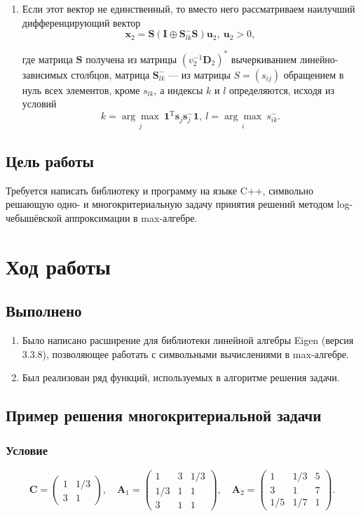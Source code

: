 \documentclass[specialist,
	substylefile = spbu_report.rtx,
	subf,href,colorlinks=true, 12pt]{disser}
\begin{document}
\begin{enumerate}
	\item Если этот вектор не единственный, то вместо него рассматриваем наилучший дифференцирующий вектор
	      \[
		      \boldsymbol{x}_2 =\boldsymbol{S}(\boldsymbol{I}\oplus\boldsymbol{S}^-_{lk}\boldsymbol{S})\boldsymbol{u}_2,~ \boldsymbol{u}_2 > 0,
	      \]

	      где матрица $\boldsymbol{S}$ получена из матрицы $(v^{-1}_2\boldsymbol{D}_2)^*$ вычеркиванием линейно-зависимых столбцов, матрица $\boldsymbol{S}^-_{lk}$ --- из матрицы $S = (s_{ij})$ обращением
	      в нуль всех элементов, кроме $s_{lk}$, а индексы $k$ и $l$ определяются, исходя из условий
	      \[
		      k = \underset{j}{\arg\max}~\boldsymbol{1}^\mathrm{T}\boldsymbol{s}_j\boldsymbol{s}^-_j\boldsymbol{1},~l = \underset{i}{\arg\max} ~s^-_{ik}.
	      \]
\end{enumerate}


\section{Цель работы}
Требуется написать библиотеку и программу на языке C++, символьно решающую одно- и многокритериальную задачу принятия решений методом log-чебышёвской аппроксимации в max-алгебре.

\chapter{Ход работы}
\section{Выполнено}
\begin{enumerate}
	\item Было написано расширение для библиотеки линейной алгебры Eigen \cite{eigenweb} (версия 3.3.8), позволяющее работать с символьными вычислениями в max-алгебре.
	\item Был реализован ряд функций, используемых в алгоритме решения задачи.
\end{enumerate}

\section{Пример решения многокритериальной задачи}
\subsection{Условие}

\[
	\boldsymbol{C} = \begin{pmatrix}
		1 & 1/3 \\
		3 & 1
	\end{pmatrix}, \quad
	\boldsymbol{A}_1 = \begin{pmatrix}
		1   & 3 & 1/3 \\
		1/3 & 1 & 1   \\
		3   & 1 & 1
	\end{pmatrix}, \quad
	\boldsymbol{A}_2 =  \begin{pmatrix}
		1   & 1/3 & 5 \\
		3   & 1   & 7 \\
		1/5 & 1/7 & 1
	\end{pmatrix}.
\]
\end{document}
